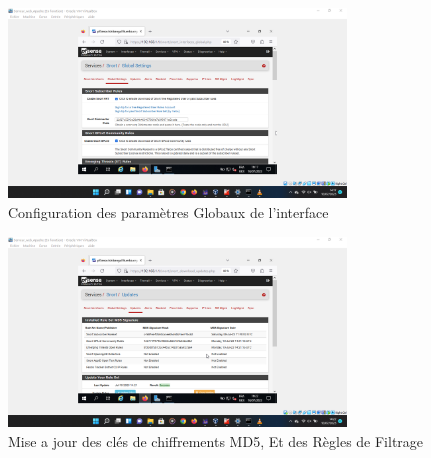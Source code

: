 	 \begin{figure}[h]
	  \begin{center}
	   	\includegraphics[width=0.8\textwidth]{photo_memoireConfig/Global_settings.png}
	   \caption{Configuration des paramètres Globaux de l'interface}
	    \end{center}
	 \end{figure}
	 
	 \begin{figure}[h]
	 	  \begin{center}
	 	 	\includegraphics[width=0.8\textwidth]{photo_memoireConfig/Update_des Cles MD5.png}
	 	 \caption{Mise  a jour des clés de chiffrements MD5, Et des Règles de Filtrage }
	\end{center}
	 \end{figure}
 


